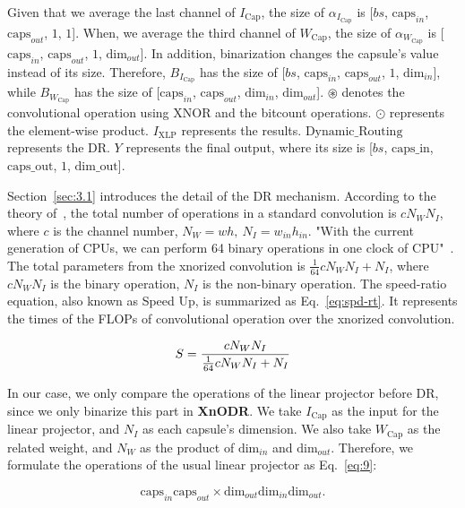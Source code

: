\documentclass[sn-mathphys,iicol,Numbered]{sn-jnl}
\begin{document}
Given that we average the last channel of $I_{\text{Cap}}$, the size of $\alpha_{I_{\text{Cap}}}$ is [$bs$, $\text{caps}_{in}$, $\text{caps}_{out}$, $1$, $1$]. When, we average the third channel of $W_{\text{Cap}}$, the size of $\alpha_{W_{\text{Cap}}}$ is [$\text{caps}_{in}$, $\text{caps}_{out}$, $1$, $\text{dim}_{out}$]. In addition, binarization changes the capsule's value instead of its size. Therefore, $B_{I_{\text{Cap}}}$ has the size of [$bs$, $\text{caps}_{in}$, $\text{caps}_{out}$, $1$, $\text{dim}_{in}$], while $B_{W_{\text{Cap}}}$ has the size of [$\text{caps}_{in}$, $\text{caps}_{out}$, $\text{dim}_{in}$, $\text{dim}_{out}$]. $\circledast$ denotes the convolutional operation using XNOR and the bitcount operations. $\odot$ represents the element-wise product. $I_{\text{XLP}}$ represents the results. $\text{Dynamic\_Routing}$ represents the DR. $Y$ represents the final output, where its size is [$bs$, $\text{caps\_in}$, $\text{caps\_out}$, $1$, $\text{dim\_out}$].

Section~\ref{sec:3.1} introduces the detail of the DR mechanism. According to the theory of~\cite{A2_xnor}, the total number of operations in a standard convolution is $cN_{W}N_{I}$, where $c$ is the channel number, $N_{W}=wh,\ N_{I}=w_{in}h_{in}$. "With the current generation of CPUs, we can perform 64 binary operations in one clock of CPU"~\citep{A2_xnor}. The total parameters from the xnorized convolution is $\frac{1}{64}cN_{W}N_{I}+N_{I}$, where $cN_{W}N_{I}$ is the binary operation, $N_{I}$ is the  non-binary operation. The speed-ratio equation, also known as Speed Up, is summarized as Eq.~\ref{eq:spd-rt}. It represents the times of the FLOPs of convolutional operation over the xnorized convolution.

\begin{equation}\small \label{eq:spd-rt}
    S=\frac{cN_{W}N_{I}}{\frac{1}{64}cN_{W}N_{I}+N_{I}}
\end{equation}

In our case, we only compare the operations of the linear projector before DR, since we only binarize this part in \textbf{XnODR}. We take $I_{\text{Cap}}$ as the input for the linear projector, and $N_{I}$ as each capsule's dimension. We also take $W_{\text{Cap}}$ as the related weight, and $N_{W}$ as the product of $\text{dim}_{in}$ and $\text{dim}_{out}$. Therefore, we formulate the operations of the usual linear projector as Eq.~\ref{eq:9}:

\vspace{-0.5cm}
\begin{equation} \label{eq:9}
\text{caps}_{in}\text{caps}_{out}\times \text{dim}_{out}\text{dim}_{in}\text{dim}_{out}.
\end{equation}
\end{document}
